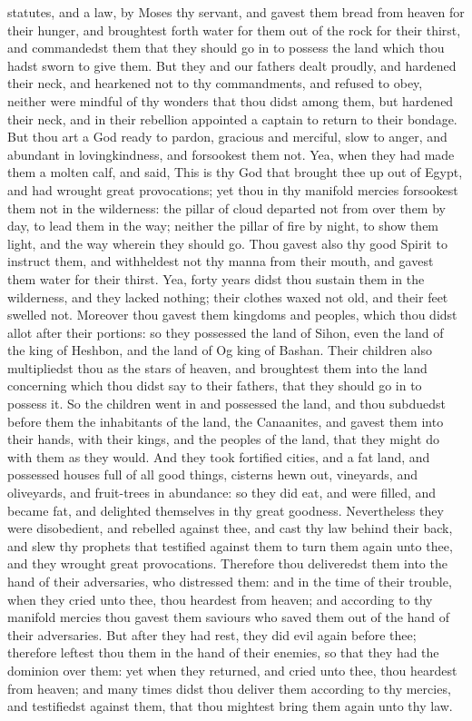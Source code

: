 statutes, and a law, by Moses thy servant, and gavest them bread from heaven for their hunger, and broughtest forth water for them out of the rock for their thirst, and commandedst them that they should go in to possess the land which thou hadst sworn to give them.  But they and our fathers dealt proudly, and hardened their neck, and hearkened not to thy commandments, and refused to obey, neither were mindful of thy wonders that thou didst among them, but hardened their neck, and in their rebellion appointed a captain to return to their bondage. But thou art a God ready to pardon, gracious and merciful, slow to anger, and abundant in lovingkindness, and forsookest them not. Yea, when they had made them a molten calf, and said, This is thy God that brought thee up out of Egypt, and had wrought great provocations; yet thou in thy manifold mercies forsookest them not in the wilderness: the pillar of cloud departed not from over them by day, to lead them in the way; neither the pillar of fire by night, to show them light, and the way wherein they should go. Thou gavest also thy good Spirit to instruct them, and withheldest not thy manna from their mouth, and gavest them water for their thirst. Yea, forty years didst thou sustain them in the wilderness, and they lacked nothing; their clothes waxed not old, and their feet swelled not. Moreover thou gavest them kingdoms and peoples, which thou didst allot after their portions: so they possessed the land of Sihon, even the land of the king of Heshbon, and the land of Og king of Bashan. Their children also multipliedst thou as the stars of heaven, and broughtest them into the land concerning which thou didst say to their fathers, that they should go in to possess it. So the children went in and possessed the land, and thou subduedst before them the inhabitants of the land, the Canaanites, and gavest them into their hands, with their kings, and the peoples of the land, that they might do with them as they would. And they took fortified cities, and a fat land, and possessed houses full of all good things, cisterns hewn out, vineyards, and oliveyards, and fruit-trees in abundance: so they did eat, and were filled, and became fat, and delighted themselves in thy great goodness.  Nevertheless they were disobedient, and rebelled against thee, and cast thy law behind their back, and slew thy prophets that testified against them to turn them again unto thee, and they wrought great provocations. Therefore thou deliveredst them into the hand of their adversaries, who distressed them: and in the time of their trouble, when they cried unto thee, thou heardest from heaven; and according to thy manifold mercies thou gavest them saviours who saved them out of the hand of their adversaries. But after they had rest, they did evil again before thee; therefore leftest thou them in the hand of their enemies, so that they had the dominion over them: yet when they returned, and cried unto thee, thou heardest from heaven; and many times didst thou deliver them according to thy mercies, and testifiedst against them, that thou mightest bring them again unto thy law. 